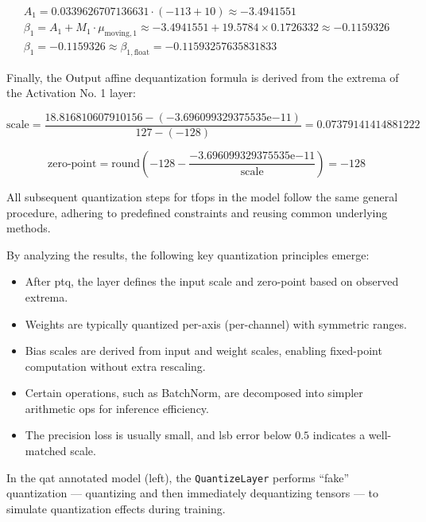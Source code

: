 {\begin{equation*}
\begin{gathered}
A_1 = 0.0339626707136631 \cdot (-113 + 10) \approx -3.4941551 \\
\beta_1 = A_1 + M_1 \cdot \mu_{\text{moving},1} \approx -3.4941551 + 19.5784 \times 0.1726332 \approx -0.1159326 \\
\beta_1 = -0.1159326 \approx \beta_{1,\text{float}} = -0.11593257635831833
\end{gathered}
\end{equation*}

Finally, the Output affine dequantization formula is derived from the extrema of the Activation No. 1 layer:

\begin{equation*}
\text{scale} = \frac{18.816810607910156 - (-3.696099329375535 \mathrm{e}{-11})}{127 - (-128)} = 0.07379141414881222
\end{equation*}

\begin{equation*}
\text{zero-point} = \text{round}\left( -128 - \frac{-3.696099329375535 \mathrm{e}{-11}}{\text{scale}} \right) = -128
\end{equation*}

All subsequent quantization steps for \glspl{tfop} in the model follow the same general procedure, adhering to predefined constraints and reusing common underlying methods.

By analyzing the results, the following key quantization principles emerge:
\begin{itemize}
    \item After \gls{ptq}, the  layer defines the input scale and zero-point based on observed extrema.
    \item Weights are typically quantized per-axis (per-channel) with symmetric ranges.
    \item Bias scales are derived from input and weight scales, enabling fixed-point computation without extra rescaling.
    \item Certain operations, such as BatchNorm, are decomposed into simpler arithmetic ops for inference efficiency.
    \item The precision loss is usually small, and \gls{lsb} error below $0.5$ indicates a well-matched scale.
\end{itemize}

In the \gls{qat} annotated model (left), the \texttt{QuantizeLayer} performs ``fake'' quantization --- quantizing and then immediately dequantizing tensors --- to simulate quantization effects during training.

}
